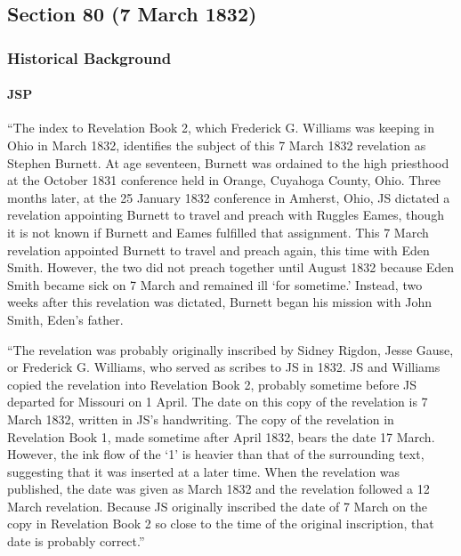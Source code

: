 \subsection{Section 80 (7 March 1832)}
	\label{DC80}
	
	\subsubsection{Historical Background}
		\label{DC80-HB}
		
		\paragraph{JSP}
		
			``The index to Revelation Book 2, which Frederick G. Williams was keeping in Ohio in March 1832, identifies the subject of this 7 March 1832 revelation as Stephen Burnett. At age seventeen, Burnett was ordained to the high priesthood at the October 1831 conference held in Orange, Cuyahoga County, Ohio. Three months later, at the 25 January 1832 conference in Amherst, Ohio, JS dictated a revelation appointing Burnett to travel and preach with Ruggles Eames, though it is not known if Burnett and Eames fulfilled that assignment. This 7 March revelation appointed Burnett to travel and preach again, this time with Eden Smith. However, the two did not preach together until August 1832 because Eden Smith became sick on 7 March and remained ill `for sometime.' Instead, two weeks after this revelation was dictated, Burnett began his mission with John Smith, Eden's father.
			
			``The revelation was probably originally inscribed by Sidney Rigdon, Jesse Gause, or Frederick G. Williams, who served as scribes to JS in 1832. JS and Williams copied the revelation into Revelation Book 2, probably sometime before JS departed for Missouri on 1 April. The date on this copy of the revelation is 7 March 1832, written in JS's handwriting. The copy of the revelation in Revelation Book 1, made sometime after April 1832, bears the date 17 March. However, the ink flow of the `1' is heavier than that of the surrounding text, suggesting that it was inserted at a later time. When the revelation was published, the date was given as March 1832 and the revelation followed a 12 March revelation. Because JS originally inscribed the date of 7 March on the copy in Revelation Book 2 so close to the time of the original inscription, that date is probably correct.''
		
